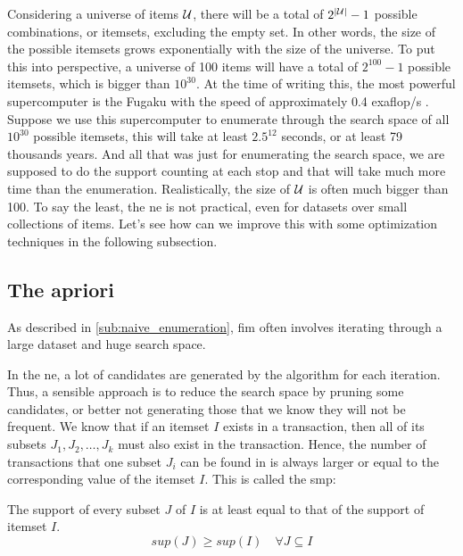 Considering a universe of items $\mathcal{U}$, there will be a total of $2^{\left\lvert \mathcal{U} \right\rvert} - 1$ possible combinations, or itemsets, excluding the empty set.
In other words, the size of the possible itemsets grows exponentially with the size of the universe.
To put this into perspective, a universe of 100 items will have a total of $2^{100} - 1$ possible itemsets, which is bigger than $10^{30}$.
At the time of writing this, the most powerful supercomputer is the Fugaku with the speed of approximately 0.4 exaflop/s \citep{monroe_fugaku_2020}.
Suppose we use this supercomputer to enumerate through the search space of all $10^{30}$ possible itemsets, this will take at least $2.5^{12}$ seconds, or at least 79 thousands years.
And all that was just for enumerating the search space, we are supposed to do the support counting at each stop and that will take much more time than the enumeration.
Realistically, the size of $\mathcal{U}$ is often much bigger than 100.
To say the least, the \acl{ne} is not practical, even for datasets over small collections of items.
Let's see how can we improve this with some optimization techniques in the following subsection.

\subsection{The \acl{apriori}}
\label{sub:optimization_techniques}
As described in \autoref{sub:naive_enumeration}, \acl{fim} often involves iterating through a large dataset and huge search space.

In the \acl{ne}, a lot of candidates are generated by the algorithm for each iteration.
Thus, a sensible approach is to reduce the search space by pruning some candidates, or better not generating those that we know they will not be frequent.
We know that if an itemset $I$ exists in a transaction, then all of its subsets $J_1, J_2, \dots, J_k$ must also exist in the transaction.
Hence, the number of transactions that one subset $J_i$ can be found in is always larger or equal to the corresponding value of the itemset $I$. This is called the \acl{smp}:
\begin{definition}
    The support of every subset $J$ of $I$ is at least equal to that of the support of itemset $I$.
    \begin{equation}
        sup(J) \geq sup(I) \quad \forall J \subseteq I
    \end{equation}
\end{definition}

